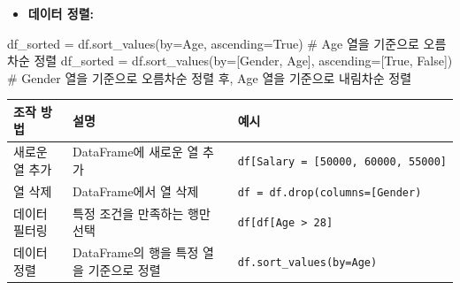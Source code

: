 \documentclass[
  letterpaper,
]{book}
\newenvironment{Shaded}{\begin{snugshade}}{\end{snugshade}}
\newcommand{\CommentTok}[1]{\textcolor[rgb]{0.37,0.37,0.37}{#1}}
\newcommand{\NormalTok}[1]{\textcolor[rgb]{0.00,0.23,0.31}{#1}}
\newcommand{\OperatorTok}[1]{\textcolor[rgb]{0.37,0.37,0.37}{#1}}
\newcommand{\StringTok}[1]{\textcolor[rgb]{0.13,0.47,0.30}{#1}}
\newcommand{\VariableTok}[1]{\textcolor[rgb]{0.07,0.07,0.07}{#1}}
\providecommand{\tightlist}{%
  \setlength{\itemsep}{0pt}\setlength{\parskip}{0pt}}
\begin{document}
\begin{itemize}
\tightlist
\item
  \textbf{데이터 정렬:}
\end{itemize}

\begin{Shaded}
\begin{Highlighting}[]
\NormalTok{    df\_sorted }\OperatorTok{=}\NormalTok{ df.sort\_values(by}\OperatorTok{=}\StringTok{\textquotesingle{}Age\textquotesingle{}}\NormalTok{, ascending}\OperatorTok{=}\VariableTok{True}\NormalTok{) }\CommentTok{\# \textquotesingle{}Age\textquotesingle{} 열을 기준으로 오름차순 정렬}
\NormalTok{    df\_sorted }\OperatorTok{=}\NormalTok{ df.sort\_values(by}\OperatorTok{=}\NormalTok{[}\StringTok{\textquotesingle{}Gender\textquotesingle{}}\NormalTok{, }\StringTok{\textquotesingle{}Age\textquotesingle{}}\NormalTok{], ascending}\OperatorTok{=}\NormalTok{[}\VariableTok{True}\NormalTok{, }\VariableTok{False}\NormalTok{]) }\CommentTok{\# \textquotesingle{}Gender\textquotesingle{} 열을 기준으로 오름차순 정렬 후, \textquotesingle{}Age\textquotesingle{} 열을 기준으로 내림차순 정렬}
\end{Highlighting}
\end{Shaded}

\begin{longtable}[]{@{}
  >{\centering\arraybackslash}p{}
  >{\centering\arraybackslash}p{}
  >{\centering\arraybackslash}p{}@{}}
\toprule\noalign{}
\begin{minipage}[b]{\linewidth}\centering
조작 방법
\end{minipage} & \begin{minipage}[b]{\linewidth}\centering
설명
\end{minipage} & \begin{minipage}[b]{\linewidth}\centering
예시
\end{minipage} \\
\midrule\noalign{}
\endhead
\bottomrule\noalign{}
\endlastfoot
새로운 열 추가 & DataFrame에 새로운 열 추가 &
\texttt{df{[}\textquotesingle{}Salary\textquotesingle{}{]}\ =\ {[}50000,\ 60000,\ 55000{]}} \\
열 삭제 & DataFrame에서 열 삭제 &
\texttt{df\ =\ df.drop(columns={[}\textquotesingle{}Gender\textquotesingle{}{]})} \\
데이터 필터링 & 특정 조건을 만족하는 행만 선택 &
\texttt{df{[}df{[}\textquotesingle{}Age\textquotesingle{}{]}\ \textgreater{}\ 28{]}} \\
데이터 정렬 & DataFrame의 행을 특정 열을 기준으로 정렬 &
\texttt{df.sort\_values(by=\textquotesingle{}Age\textquotesingle{})} \\
\end{longtable}
\end{document}

